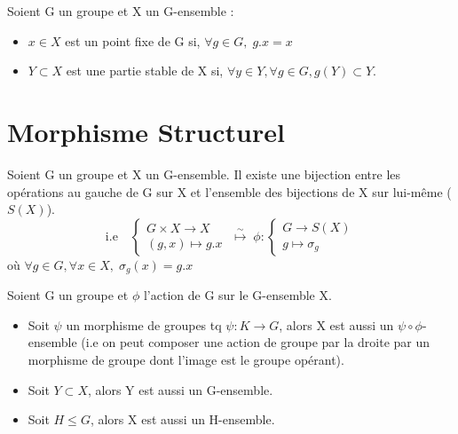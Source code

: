 \begin{definition}
	Soient G un groupe et X un G-ensemble :
	\begin{itemize}
		\item $x \in X$ est un point fixe de G si, $ \forall g \in G, \; g.x = x$ 
		\item $Y \subset X$ est une partie stable de X si, $ \forall y \in Y, \forall g \in G, g(Y) \subset Y$.
	\end{itemize}
\end{definition}



\newpage
\section{Morphisme Structurel}

\begin{theorem}
	Soient G un groupe et X un G-ensemble. Il existe une bijection entre les opérations au gauche de G sur X 
	et l'ensemble des bijections de X sur lui-même ($S(X)$). 
	\[ \text{i.e} \quad 
		\begin{cases}
			G \times X \rightarrow X \\
			(g,x) \mapsto g.x
		\end{cases}
		\; \overset{\sim}{\longmapsto} \; \phi :
		\begin{cases}
			G \rightarrow S(X) \\ 
			g \mapsto \sigma_g 
		\end{cases}
	\]
	où $ \forall g \in G, \forall x \in X, \; \sigma_g(x) = g.x $
\end{theorem}


\begin{proposition}
	Soient G un groupe et $\phi$ l'action de G sur le G-ensemble X. 
	\begin{itemize}
		\item Soit $\psi$ un morphisme de groupes tq $ \psi : K \rightarrow G$, alors X est aussi un $\psi \circ \phi$-ensemble 
		(i.e on peut composer une action de groupe par la droite par un morphisme de groupe dont l'image est le groupe opérant).
		\item Soit $Y \subset X$, alors Y est aussi un G-ensemble. 
		\item Soit $H \leq G$, alors X est aussi un H-ensemble. 
	\end{itemize}
\end{proposition}

